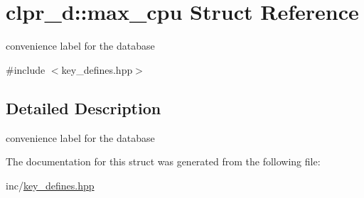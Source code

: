 \hypertarget{structclpr__d_1_1max__cpu}{\section{clpr\-\_\-d\-:\-:max\-\_\-cpu \-Struct \-Reference}
\label{structclpr__d_1_1max__cpu}
}


convenience label for the database  




{\ttfamily \#include $<$key\-\_\-defines.\-hpp$>$}



\subsection{\-Detailed \-Description}
convenience label for the database 

\-The documentation for this struct was generated from the following file\-:\begin{DoxyCompactItemize}
\item 
inc/\hyperlink{key__defines_8hpp}{key\-\_\-defines.\-hpp}\end{DoxyCompactItemize}
